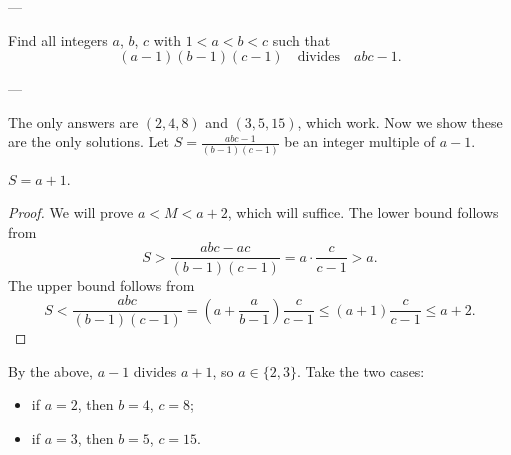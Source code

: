 
---

Find all integers $a$, $b$, $c$ with $1<a<b<c$ such that\[(a-1)(b-1)(c-1)\quad\text{divides}\quad abc-1.\]

---

The only answers are $(2,4,8)$ and $(3,5,15)$, which work. Now we show these are the only solutions. Let $S=\frac{abc-1}{(b-1)(c-1)}$ be an integer multiple of $a-1$.
\begin{claim*}
    $S=a+1$.
\end{claim*}
\begin{proof}
    We will prove $a<M<a+2$, which will suffice. The lower bound follows from \[S>\frac{abc-ac}{(b-1)(c-1)}=a\cdot\frac c{c-1}>a.\]
    The upper bound follows from \[S<\frac{abc}{(b-1)(c-1)}=\left(a+\frac a{b-1}\right)\frac c{c-1}\le(a+1)\frac c{c-1}\le a+2.\]
\end{proof}

By the above, $a-1$ divides $a+1$, so $a\in\{2,3\}$. Take the two cases:
\begin{itemize}[itemsep=0em]
    \item if $a=2$, then $b=4$, $c=8$;
    \item if $a=3$, then $b=5$, $c=15$.
\end{itemize}

